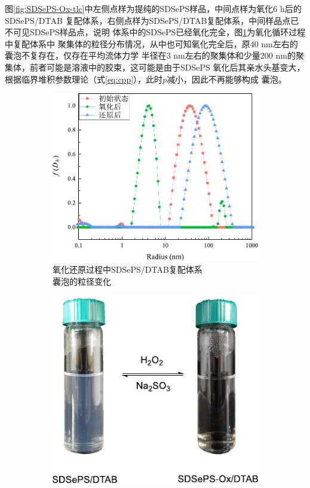 \documentclass[bachelor,winfonts,replaceperiod]{jnuthesis}
\begin{document}
    图\ref{fig:SDSePS-Ox-tlc}中左侧点样为提纯的SDSePS样品，中间点样为氧化6 h后的SDSePS/DTAB
    复配体系，右侧点样为SDSePS/DTAB复配体系，中间样品点已不可见SDSePS样品点，说明
    体系中的SDSePS已经氧化完全，图\ref{fig:SDSePS-redox-radius}为氧化循环过程中复配体系中
    聚集体的粒径分布情况，从中也可知氧化完全后，原40 nm左右的囊泡不复存在，仅存在平均流体力学
    半径在3 nm左右的聚集体和少量200 nm的聚集体，前者可能是溶液中的胶束，这可能是由于SDSePS
    氧化后其亲水头基变大，根据临界堆积参数理论（式\ref{eq:cpp}），此时$p$减小，因此不再能够构成
    囊泡。
    
    \begin{figure}[htbp]
        \begin{subfigure}[]{.5\textwidth}
            \centering
            \includegraphics[width=.98\textwidth]{figure/SDSePS-redox-radius.pdf}
            \caption{氧化还原过程中SDSePS/DTAB复配体系\\ 囊泡的粒径变化}\label{fig:SDSePS-redox-radius}
        \end{subfigure}%
        \begin{subfigure}[]{.5\textwidth}
            \centering
            \includegraphics[width=.8\textwidth]{figure/scheme-SDSePS-redox.pdf}

\end{subfigure}
\end{figure}
\end{document}
